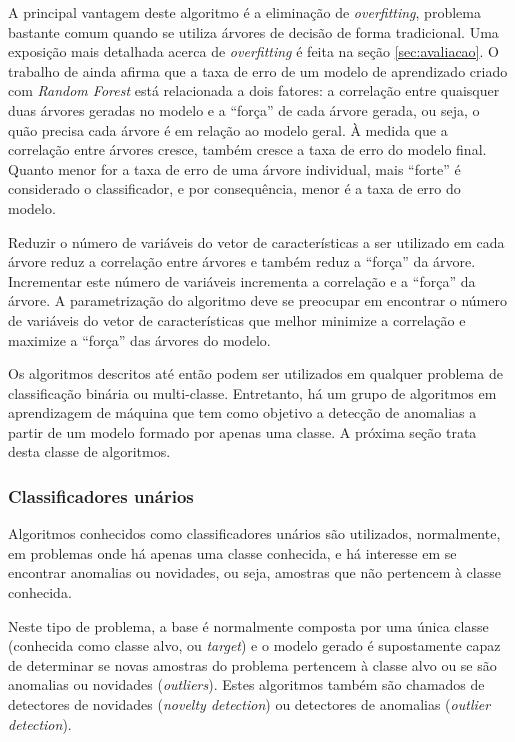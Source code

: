 A principal vantagem deste algoritmo é a eliminação de \textit{overfitting}, problema bastante comum quando se utiliza árvores de decisão de forma tradicional. Uma exposição mais detalhada acerca de \textit{overfitting} é feita na seção \ref{sec:avaliacao}. O trabalho de  ainda afirma que a taxa de erro de um modelo de aprendizado criado com \textit{Random Forest} está relacionada a dois fatores: a correlação entre quaisquer duas árvores geradas no modelo e a ``força'' de cada árvore gerada, ou seja, o quão precisa cada árvore é em relação ao modelo geral. À medida que a correlação entre árvores cresce, também cresce a taxa de erro do modelo final. Quanto menor for a taxa de erro de uma árvore individual, mais ``forte'' é considerado o classificador, e por consequência, menor é a taxa de erro do modelo.

Reduzir o número de variáveis do vetor de características a ser utilizado em cada árvore reduz a correlação entre árvores e também reduz a ``força'' da árvore. Incrementar este número de variáveis incrementa a correlação e a ``força'' da árvore. A parametrização do algoritmo deve se preocupar em encontrar o número de variáveis do vetor de características que melhor minimize a correlação e maximize a ``força'' das árvores do modelo.

Os algoritmos descritos até então podem ser utilizados em qualquer problema de classificação binária ou multi-classe. Entretanto, há um grupo de algoritmos em aprendizagem de máquina que tem como objetivo a detecção de anomalias a partir de um modelo formado por apenas uma classe. A próxima seção trata desta classe de algoritmos.

\subsubsection*{Classificadores unários}

Algoritmos conhecidos como classificadores unários são utilizados, normalmente, em problemas onde há apenas uma classe conhecida, e há interesse em se encontrar anomalias ou novidades, ou seja, amostras que não pertencem à classe conhecida.

 Neste tipo de problema, a base é normalmente composta por uma única classe (conhecida como classe alvo, ou \textit{target}) e o modelo gerado é supostamente capaz de determinar se novas amostras do problema pertencem à classe alvo ou se são anomalias ou novidades (\textit{outliers}). Estes algoritmos também são chamados de detectores de novidades (\textit{novelty detection}) ou detectores de anomalias (\textit{outlier detection}).

